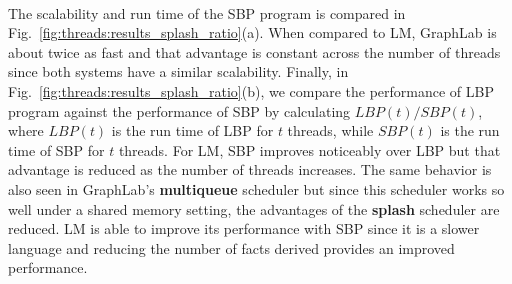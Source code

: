 \begin{figure}[]
\begin{subfigure}[b]{\plotsize\textwidth}
           \label{fig:threads:splash_multi}
        \end{subfigure} \\
        \label{fig:threads:results_splash}
\end{figure}

The scalability and run time of the SBP program is compared in
Fig.~\ref{fig:threads:results_splash_ratio}(a). When compared to LM, GraphLab is
about twice as fast and that advantage is constant across the number of threads
since both systems have a similar scalability. Finally, in
Fig.~\ref{fig:threads:results_splash_ratio}(b), we compare the performance of
LBP program against the performance of SBP by calculating $LBP(t)/SBP(t)$, where
$LBP(t)$ is the run time of LBP for $t$ threads, while $SBP(t)$ is the run time
of SBP for $t$ threads. For LM, SBP improves noticeably over LBP but that
advantage is reduced as the number of threads increases. The same behavior is
also seen in GraphLab's \textbf{multiqueue} scheduler but since this scheduler
works so well under a shared memory setting, the advantages of the
\textbf{splash} scheduler are reduced. LM is able to improve its performance
with SBP since it is a slower language and reducing the number of facts derived
provides an improved performance.

